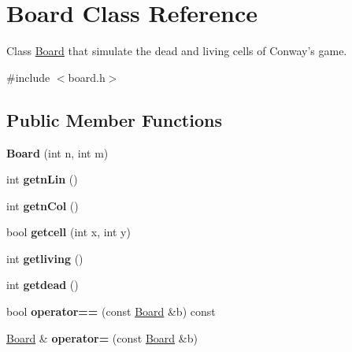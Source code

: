 \hypertarget{class_board}{\section{Board Class Reference}
\label{class_board}
}


Class \hyperlink{class_board}{Board} that simulate the dead and living cells of Conway's game.  




{\ttfamily \#include $<$board.\-h$>$}

\subsection*{Public Member Functions}
\begin{DoxyCompactItemize}
\item 
\hypertarget{class_board_ad16c6df61795b66bf7f778bf618d7582}{{\bfseries Board} (int n, int m)}\label{class_board_ad16c6df61795b66bf7f778bf618d7582}

\item 
\hypertarget{class_board_a0ddcc28d566b601877bb44ec84b29b74}{int {\bfseries getn\-Lin} ()}\label{class_board_a0ddcc28d566b601877bb44ec84b29b74}

\item 
\hypertarget{class_board_a8b2398005e6a676f377fd84d6be57bea}{int {\bfseries getn\-Col} ()}\label{class_board_a8b2398005e6a676f377fd84d6be57bea}

\item 
\hypertarget{class_board_a6cd6d7b7bb69ecbcc9a4eadf4b79b1c6}{bool {\bfseries getcell} (int x, int y)}\label{class_board_a6cd6d7b7bb69ecbcc9a4eadf4b79b1c6}

\item 
\hypertarget{class_board_a70175aafce4f24c184984a1a2b44c359}{int {\bfseries getliving} ()}\label{class_board_a70175aafce4f24c184984a1a2b44c359}

\item 
\hypertarget{class_board_aa96a76e3db16efcff817d12be8af54a9}{int {\bfseries getdead} ()}\label{class_board_aa96a76e3db16efcff817d12be8af54a9}

\item 
\hypertarget{class_board_a4318d1bd42b681e210fd0a6987fa0258}{bool {\bfseries operator==} (const \hyperlink{class_board}{Board} \&b) const }\label{class_board_a4318d1bd42b681e210fd0a6987fa0258}

\item 
\hypertarget{class_board_a54ea3c65eb9bdedfc9d9672c5d9f0f89}{\hyperlink{class_board}{Board} \& {\bfseries operator=} (const \hyperlink{class_board}{Board} \&b)}\label{class_board_a54ea3c65eb9bdedfc9d9672c5d9f0f89}


\end{DoxyCompactItemize}
